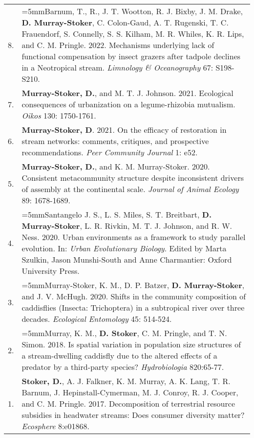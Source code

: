 \documentclass[letterpaper,11pt,oneside]{article}
\begin{document}
\def\arraystretch{1.4}
\noindent
\begin{longtable}{@{} p{0.5cm} >{\raggedright\arraybackslash}p{16.7cm}}
8. & \hangindent=5mmBarnum, T., R., J. T. Wootton, R. J. Bixby, J. M. Drake, \textbf{D. Murray-Stoker}, C. Colon-Gaud, A. T. Rugenski, T. C. Frauendorf, S. Connelly, S. S. Kilham, M. R. Whiles, K. R. Lips, and C. M. Pringle. 2022. Mechanisms underlying lack of functional compensation by insect grazers after tadpole declines in a Neotropical stream. \textit{Limnology \& Oceanography} 67: S198-S210. \\
7. & \hangindent=5mm\textbf{Murray-Stoker, D.}, and M. T. J. Johnson. 2021. Ecological consequences of urbanization on a legume-rhizobia mutualism. \textit{Oikos} 130: 1750-1761. \\
6. & \hangindent=5mm\textbf{Murray-Stoker, D}. 2021. On the efficacy of restoration in stream networks: comments, critiques, and prospective recommendations. \textit{Peer Community Journal} 1: e52. \\
5. & \hangindent=5mm\textbf{Murray-Stoker, D.}, and K. M. Murray-Stoker. 2020. Consistent metacommunity structure despite inconsistent drivers of assembly at the continental scale. \textit{Journal of Animal Ecology} 89: 1678-1689. \\
4. & \hangindent=5mmSantangelo J. S., L. S. Miles, S. T. Breitbart, \textbf{D. Murray-Stoker}, L. R. Rivkin, M. T. J. Johnson, and R. W. Ness. 2020. Urban environments as a framework to study parallel evolution. In: \textit{Urban Evolutionary Biology}. Edited by Marta Szulkin, Jason Munshi-South and Anne Charmantier: Oxford University Press. \\
3. & \hangindent=5mmMurray-Stoker, K. M., D. P. Batzer, \textbf{D. Murray-Stoker}, and J. V. McHugh. 2020. Shifts in the community composition of caddisflies (Insecta: Trichoptera) in a subtropical river over three decades. \textit{Ecological Entomology} 45: 514-524. \\
2. & \hangindent=5mmMurray, K. M., \textbf{D. Stoker}, C. M. Pringle, and T. N. Simon. 2018. Is spatial variation in population size structures of a stream-dwelling caddisfly due to the altered effects of a predator by a third-party species? \textit{Hydrobiologia} 820:65-77. \\
1. & \hangindent=5mm\textbf{Stoker, D.}, A. J. Falkner, K. M. Murray, A. K. Lang, T. R. Barnum, J. Hepinstall-Cymerman, M. J. Conroy, R. J. Cooper, and C. M. Pringle. 2017. Decomposition of terrestrial resource subsidies in headwater streams: Does consumer diversity matter? \textit{Ecosphere} 8:e01868. \\
\end{longtable}
\end{document}
